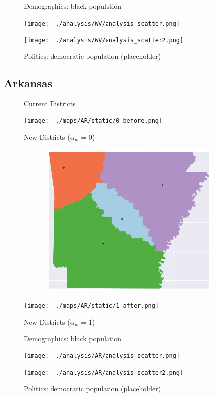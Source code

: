 \clearpage
\newpage

\begin{figure}[htb!] \centering
\caption{ Demographics: black population }
\texttt{[image: ../analysis/WV/analysis\_scatter.png]}
\caption{ Politics: democratic population (placeholder)}
\texttt{[image: ../analysis/WV/analysis\_scatter2.png]}
\end{figure}

\clearpage
\newpage

\subsection{Arkansas}
\begin{figure}[htb!] \centering
\caption{ Current Districts }
\texttt{[image: ../maps/AR/static/0\_before.png]}
\caption{ New Districts ($\alpha_w$ = 0) }
\includegraphics[width=5in,height=3in,keepaspectratio]{../maps/AR/static/0_after.png}
\caption{ New Districts ($\alpha_w$ = 1) }
\texttt{[image: ../maps/AR/static/1\_after.png]}
\end{figure}

\clearpage
\newpage

\begin{figure}[htb!] \centering
\caption{ Demographics: black population }
\texttt{[image: ../analysis/AR/analysis\_scatter.png]}
\caption{ Politics: democratic population (placeholder)}
\texttt{[image: ../analysis/AR/analysis\_scatter2.png]}
\end{figure}

\clearpage
\newpage

